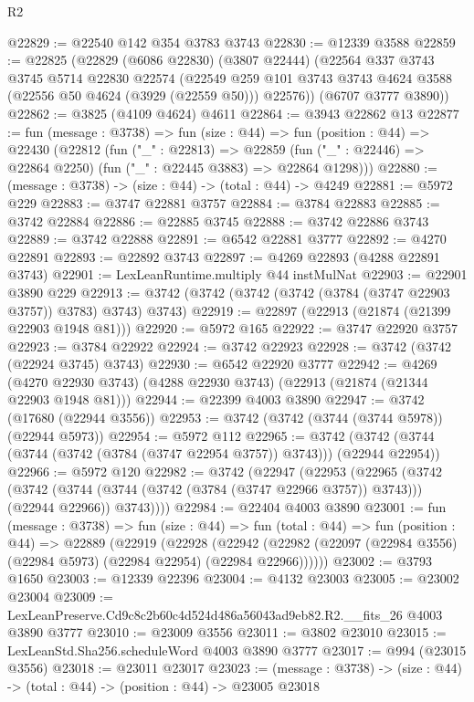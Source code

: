\begin{lexlean}{R2}
\begin{coremodule}
@22829 := @22540 @142 @354 @3783 @3743
@22830 := @12339 @3588
@22859 := @22825
    (@22829
      (@6086 @22830)
      (@3807 @22444)
      (@22564
        @337
        @3743
        @3745
        @5714
        @22830
        @22574
        (@22549 @259 @101 @3743 @3743 @4624 @3588 (@22556 @50 @4624 (@3929 (@22559 @50))) @22576))
      (@6707 @3777 @3890))
@22862 := @3825 (@4109 @4624) @4611
@22864 := @3943 @22862 @13
@22877 := fun (message : @3738) =>
  fun (size : @44) =>
  fun (position : @44) =>
  @22430
    (@22812
      (fun ("_" : @22813) =>
      @22859 (fun ("_" : @22446) => @22864 @2250) (fun ("_" : @22445 @3883) => @22864 @1298)))
@22880 := (message : @3738) -> (size : @44) -> (total : @44) -> @4249
@22881 := @5972 @229
@22883 := @3747 @22881 @3757
@22884 := @3784 @22883
@22885 := @3742 @22884
@22886 := @22885 @3745
@22888 := @3742 @22886 @3743
@22889 := @3742 @22888
@22891 := @6542 @22881 @3777
@22892 := @4270 @22891
@22893 := @22892 @3743
@22897 := @4269 @22893 (@4288 @22891 @3743)
@22901 := LexLeanRuntime.multiply @44 instMulNat
@22903 := @22901 @3890 @229
@22913 := @3742 (@3742 (@3742 (@3742 (@3784 (@3747 @22903 @3757)) @3783) @3743) @3743)
@22919 := @22897 (@22913 (@21874 (@21399 @22903 @1948 @81)))
@22920 := @5972 @165
@22922 := @3747 @22920 @3757
@22923 := @3784 @22922
@22924 := @3742 @22923
@22928 := @3742 (@3742 (@22924 @3745) @3743)
@22930 := @6542 @22920 @3777
@22942 := @4269
    (@4270 @22930 @3743)
    (@4288 @22930 @3743)
    (@22913 (@21874 (@21344 @22903 @1948 @81)))
@22944 := @22399 @4003 @3890
@22947 := @3742 (@17680 (@22944 @3556))
@22953 := @3742 (@3742 (@3744 (@3744 @5978)) (@22944 @5973))
@22954 := @5972 @112
@22965 := @3742 (@3742 (@3744 (@3744 (@3742 (@3784 (@3747 @22954 @3757)) @3743))) (@22944 @22954))
@22966 := @5972 @120
@22982 := @3742
    (@22947
      (@22953
        (@22965
          (@3742
            (@3742 (@3744 (@3744 (@3742 (@3784 (@3747 @22966 @3757)) @3743))) (@22944 @22966))
            @3743))))
@22984 := @22404 @4003 @3890
@23001 := fun (message : @3738) =>
  fun (size : @44) =>
  fun (total : @44) =>
  fun (position : @44) =>
  @22889
    (@22919
      (@22928
        (@22942 (@22982 (@22097 (@22984 @3556) (@22984 @5973) (@22984 @22954) (@22984 @22966))))))
@23002 := @3793 @1650
@23003 := @12339 @22396
@23004 := @4132 @23003
@23005 := @23002 @23004
@23009 := LexLeanPreserve.Cd9c8c2b60c4d524d486a56043ad9eb82.R2.__fits_26 @4003 @3890 @3777
@23010 := @23009 @3556
@23011 := @3802 @23010
@23015 := LexLeanStd.Sha256.scheduleWord @4003 @3890 @3777
@23017 := @994 (@23015 @3556)
@23018 := @23011 @23017
@23023 := (message : @3738) -> (size : @44) -> (total : @44) -> (position : @44) -> @23005 @23018

\end{coremodule}
\end{lexlean}
